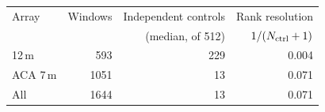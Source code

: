 \begin{tabular}{@{}lrrr@{}}
\toprule
Array & Windows & Independent controls & Rank resolution \\
 & & (median, of 512) & $1/(N_{\rm ctrl}+1)$ \\
\midrule
12\,m & 593 & 229 & 0.004 \\
ACA 7\,m & 1051 & 13 & 0.071 \\
\midrule
All & 1644 & 13 & 0.071 \\
\bottomrule
\end{tabular}
